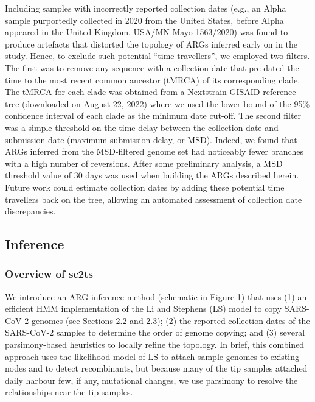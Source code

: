 \documentclass{article}
\begin{document}
Including samples with incorrectly reported collection dates (e.g., an Alpha
sample purportedly collected in 2020 from the United States, before Alpha
appeared in the United Kingdom, USA/MN-Mayo-1563/2020) was found to produce
artefacts that distorted the topology of ARGs inferred early on in the study.
Hence, to exclude such potential “time travellers”, we employed two filters.
The first was to remove any sequence with a collection date that pre-dated the
time to the most recent common ancestor (tMRCA) of its corresponding clade. The
tMRCA for each clade was obtained from a Nextstrain GISAID reference tree
(downloaded on August 22, 2022) where we used the lower bound of the 95\%
confidence interval of each clade as the minimum date cut-off. The second
filter was a simple threshold on the time delay between the collection date and
submission date (maximum submission delay, or MSD). Indeed, we found that ARGs
inferred from the MSD-filtered genome set had noticeably fewer branches with a
high number of reversions. After some preliminary analysis, a MSD threshold
value of 30 days was used when building the ARGs described herein. Future work
could estimate collection dates by adding these potential time travellers back
on the tree, allowing an automated assessment of collection date discrepancies.

\subsection{Inference}

\subsubsection{Overview of sc2ts}

We introduce an ARG inference method (schematic in Figure 1) that uses (1) an
efficient HMM implementation of the Li and Stephens (LS) model \cite{Li2003-ib}
to copy SARS-CoV-2 genomes (see Sections 2.2 and 2.3); (2) the reported
collection dates of the SARS-CoV-2 samples to determine the order of genome
copying; and (3) several parsimony-based heuristics to locally refine the
topology. In brief, this combined approach uses the likelihood model of LS to
attach sample genomes to existing nodes and to detect recombinants, but because
many of the tip samples attached daily harbour few, if any, mutational changes,
we use parsimony to resolve the relationships near the tip samples.
\end{document}
